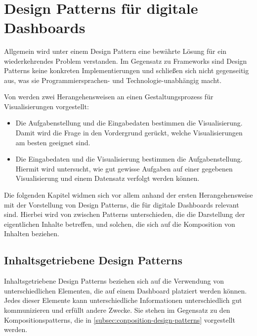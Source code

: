 \newpage
\
\newpage


\section{Design Patterns für digitale Dashboards}\label{sec:design-patterns-list}

Allgemein wird unter einem Design Pattern eine bewährte Lösung für ein wiederkehrendes Problem verstanden.
Im Gegensatz zu Frameworks sind Design Patterns keine konkreten Implementierungen und schließen sich nicht gegenseitig aus, was sie Programmiersprachen- und Technologie-unabhängig macht.

Von \citeauthor[S. 2367]{Schulz.DesignSpaceVisualizationTasks.2013} werden zwei Herangehensweisen an einen Gestaltungsprozess für Visualisierungen vorgestellt:

\begin{itemize}
    \item Die Aufgabenstellung und die Eingabedaten bestimmen die Visualisierung.
    Damit wird die Frage in den Vordergrund gerückt, welche Visualisierungen am besten geeignet sind.
    \item Die Eingabedaten und die Visualisierung bestimmen die Aufgabenstellung.
    Hiermit wird untersucht, wie gut gewisse Aufgaben auf einer gegebenen Visualisierung und einem Datensatz verfolgt werden können.
\end{itemize}

Die folgenden Kapitel widmen sich vor allem anhand der ersten Herangehensweise mit der Vorstellung von Design Patterns, die für digitale Dashboards relevant sind.
Hierbei wird von \citeauthor[S. 3--5]{Bach.DashboardDesignPatterns.2023} zwischen Patterns unterschieden, die die Darstellung der eigentlichen Inhalte betreffen, und solchen, die sich auf die Komposition von Inhalten beziehen.

\subsection{Inhaltsgetriebene Design Patterns}\label{subsec:content-design-patterns}

Inhaltsgetriebene Design Patterns beziehen sich auf die Verwendung von unterschiedlichen Elementen, die auf einem Dashboard platziert werden können.
Jedes dieser Elemente kann unterschiedliche Informationen unterschiedlich gut kommunizieren und erfüllt andere Zwecke.
Sie stehen im Gegensatz zu den Kompositionspatterns, die in \autoref{subsec:conposition-design-patterns} vorgestellt werden.

